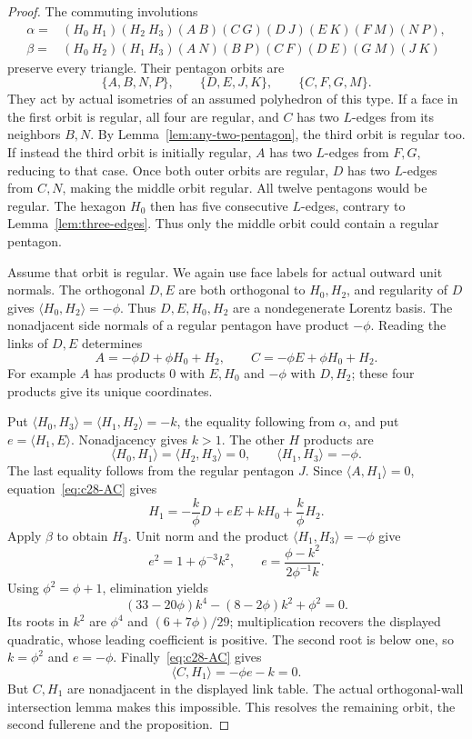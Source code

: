 \documentclass[11pt]{article}
\theoremstyle{remark}
\newcommand{\ip}[2]{\langle #1,#2\rangle}
\begin{document}
\begin{proof}
The commuting involutions
\[
 \begin{split}
 \alpha={}&(H_0\ H_1)(H_2\ H_3)(A\ B)(C\ G)
                  (D\ J)(E\ K)(F\ M)(N\ P),\\
 \beta={}&(H_0\ H_2)(H_1\ H_3)(A\ N)(B\ P)
                  (C\ F)(D\ E)(G\ M)(J\ K)
 \end{split}
\]
preserve every triangle. Their pentagon orbits are
\[
 \{A,B,N,P\},\qquad \{D,E,J,K\},\qquad \{C,F,G,M\}.
\]
They act by actual isometries of an assumed polyhedron of this type.
If a face in the first orbit is regular, all four are regular, and
$C$ has two $L$-edges from its neighbors $B,N$. By
Lemma~\ref{lem:any-two-pentagon}, the third orbit is regular too.
If instead the third orbit is initially regular, $A$ has two $L$-edges
from $F,G$, reducing to that case. Once both outer orbits are regular,
$D$ has two $L$-edges from $C,N$, making the middle orbit regular.
All twelve pentagons would be regular. The hexagon $H_0$ then has
five consecutive $L$-edges, contrary to Lemma~\ref{lem:three-edges}.
Thus only the middle orbit could contain a regular pentagon.

Assume that orbit is regular. We again use face labels for actual
outward unit normals. The orthogonal $D,E$ are both orthogonal to
$H_0,H_2$, and regularity of $D$ gives $\ip{H_0}{H_2}=-\phi$.
Thus $D,E,H_0,H_2$ are a nondegenerate Lorentz basis. The nonadjacent
side normals of a regular pentagon have product $-\phi$. Reading the
links of $D,E$ determines
\begin{equation}\label{eq:c28-AC}
 A=-\phi D+\phi H_0+H_2,\qquad
 C=-\phi E+\phi H_0+H_2.
\end{equation}
For example $A$ has products $0$ with $E,H_0$ and $-\phi$ with
$D,H_2$; these four products give its unique coordinates.

Put $\ip{H_0}{H_3}=\ip{H_1}{H_2}=-k$, the equality following from
$\alpha$, and put $e=\ip{H_1}E$. Nonadjacency gives $k>1$.
The other $H$ products are
\[
 \ip{H_0}{H_1}=\ip{H_2}{H_3}=0,
 \qquad \ip{H_1}{H_3}=-\phi.
\]
The last equality follows from the regular pentagon $J$.
Since $\ip A{H_1}=0$, equation~\eqref{eq:c28-AC} gives
\[
 H_1=-\frac{k}{\phi}D+eE+kH_0+\frac{k}{\phi}H_2.
\]
Apply $\beta$ to obtain $H_3$. Unit norm and the product
$\ip{H_1}{H_3}=-\phi$ give
\[
 e^2=1+\phi^{-3}k^2,\qquad
 e=\frac{\phi-k^2}{2\phi^{-1}k}.
\]
Using $\phi^2=\phi+1$, elimination yields
\[
 (33-20\phi)k^4-(8-2\phi)k^2+\phi^2=0.
\]
Its roots in $k^2$ are $\phi^4$ and $(6+7\phi)/29$; multiplication
recovers the displayed quadratic, whose leading coefficient is positive.
The second root is below one, so $k=\phi^2$ and $e=-\phi$.
Finally~\eqref{eq:c28-AC} gives
\[
 \ip C{H_1}=-\phi e-k=0.
\]
But $C,H_1$ are nonadjacent in the displayed link table. The actual
orthogonal-wall intersection lemma makes this impossible. This resolves
the remaining orbit, the second fullerene and the proposition.
\end{proof}
\end{document}
